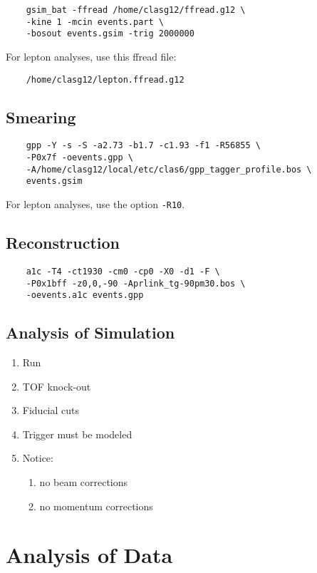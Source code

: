 \documentclass[10pt,twocolumn,oneside,letterpaper]{article}
\begin{document}
\begin{verbatim}
    gsim_bat -ffread /home/clasg12/ffread.g12 \
    -kine 1 -mcin events.part \
    -bosout events.gsim -trig 2000000
\end{verbatim}
For lepton analyses, use this ffread file:
\begin{verbatim}
    /home/clasg12/lepton.ffread.g12
\end{verbatim}

\subsection{Smearing}

\begin{verbatim}
    gpp -Y -s -S -a2.73 -b1.7 -c1.93 -f1 -R56855 \
    -P0x7f -oevents.gpp \
    -A/home/clasg12/local/etc/clas6/gpp_tagger_profile.bos \
    events.gsim
\end{verbatim}
For lepton analyses, use the option \verb|-R10|.

\subsection{Reconstruction}

\begin{verbatim}
    a1c -T4 -ct1930 -cm0 -cp0 -X0 -d1 -F \
    -P0x1bff -z0,0,-90 -Aprlink_tg-90pm30.bos \
    -oevents.a1c events.gpp
\end{verbatim}

\subsection{Analysis of Simulation}

\begin{enumerate}
    \item Run \prog{eloss}
    \item TOF knock-out
    \item Fiducial cuts
    \item Trigger must be modeled
    \item Notice:
    \begin{enumerate}
        \item no beam corrections
        \item no momentum corrections
    \end{enumerate}
\end{enumerate}

\section{Analysis of Data}
\end{document}
